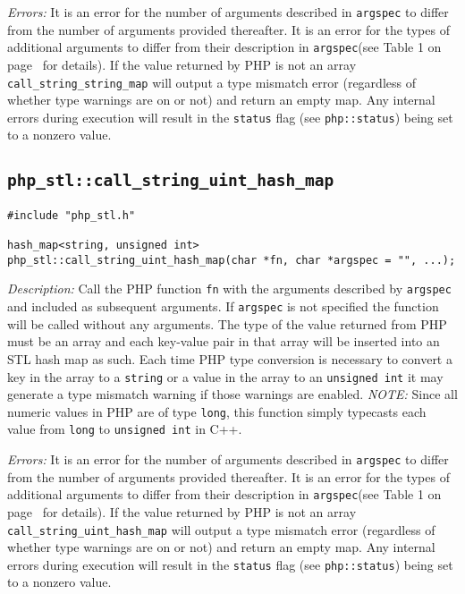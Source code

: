 \documentclass[11pt,titlepage]{article}
\begin{document}
\emph{Errors:} It is an error for the number of arguments described in \verb|argspec| to differ from the number of arguments provided thereafter. It is an error for the types of additional arguments to differ from their description in \verb|argspec|(see Table 1 on page~\pageref{Table1} for details). If the value returned by PHP is not an array \verb|call_string_string_map| will output a type mismatch error (regardless of whether type warnings are on or not) and return an empty map. Any internal errors during execution will result in the \verb|status| flag (see \verb|php::status|) being set to a nonzero value.


\subsection{\texttt{php\_stl::call\_string\_uint\_hash\_map}}

\begin{verbatim}
#include "php_stl.h"

hash_map<string, unsigned int>
php_stl::call_string_uint_hash_map(char *fn, char *argspec = "", ...);
\end{verbatim}

\emph{Description:} Call the PHP function \verb|fn| with the arguments described by \verb|argspec| and included as subsequent arguments. If \verb|argspec| is not specified the function will be called without any arguments. The type of the value returned from PHP must be an array and each key-value pair in that array will be inserted into an STL hash map as such. Each time PHP type conversion is necessary to convert a key in the array to a \verb|string| or a value in the array to an \verb|unsigned int| it may generate a type mismatch warning if those warnings are enabled. \emph{NOTE:} Since all numeric values in PHP are of type \verb|long|, this function simply typecasts each value from \verb|long| to \verb|unsigned int| in C++.

\emph{Errors:} It is an error for the number of arguments described in \verb|argspec| to differ from the number of arguments provided thereafter. It is an error for the types of additional arguments to differ from their description in \verb|argspec|(see Table 1 on page~\pageref{Table1} for details). If the value returned by PHP is not an array \verb|call_string_uint_hash_map| will output a type mismatch error (regardless of whether type warnings are on or not) and return an empty map. Any internal errors during execution will result in the \verb|status| flag (see \verb|php::status|) being set to a nonzero value.
\end{document}
